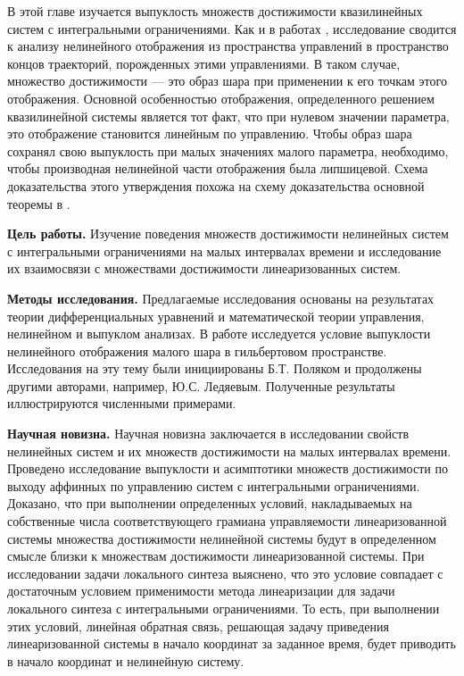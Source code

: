 \documentclass[../main.tex]{subfiles}
\begin{document}
В этой главе изучается выпуклость множеств достижимости квазилинейных систем с интегральными ограничениями. 
Как и в работах \cite{Polyak2001, Polyak2004, GusOsSteklov, GusevUMJ, Osipov, GusevOsipov},  исследование сводится к анализу нелинейного отображения из пространства управлений в пространство концов траекторий, порожденных этими управлениями.
В таком случае, множество достижимости --- это образ шара при применении к его точкам этого отображения. 
Основной особенностью отображения, определенного решением квазилинейной системы является тот факт, что при нулевом значении параметра, это отображение становится линейным по управлению.
Чтобы образ шара сохранял свою выпуклость при малых значениях малого параметра, необходимо, чтобы производная нелинейной части отображения была липшицевой. 
Схема доказательства этого утверждения похожа на схему доказательства основной теоремы в \cite{Polyak2001}.

\textbf{Цель работы.} Изучение поведения множеств достижимости нелинейных систем с интегральными ограничениями на малых интервалах времени и исследование их взаимосвязи с множествами достижимости линеаризованных систем.
	
\textbf{Методы исследования.} Предлагаемые исследования основаны на результатах теории дифференциальных уравнений и математической теории управления, нелинейном и выпуклом анализах. В работе исследуется условие выпуклости нелинейного отображения малого шара в гильбертовом пространстве. Исследования на эту тему были инициированы Б.Т. Поляком\cite{Polyak2001} и продолжены другими авторами, например, Ю.С. Ледяевым\cite{Ledyaev}. Полученные результаты иллюстрируются численными примерами.
	
\textbf{Научная новизна.} Научная новизна заключается в исследовании свойств нелинейных систем и их множеств достижимости на малых интервалах времени. Проведено исследование выпуклости и асимптотики множеств достижимости по выходу аффинных по управлению систем с интегральными ограничениями. Доказано, что при выполнении определенных условий, накладываемых на собственные числа соответствующего грамиана управляемости линеаризованной системы множества достижимости нелинейной системы будут в определенном смысле близки к множествам достижимости линеаризованной системы. При исследовании задачи локального синтеза выяснено, что это условие совпадает с достаточным условием применимости метода линеаризации для задачи локального синтеза с интегральными ограничениями. То есть, при выполнении этих условий, линейная обратная связь, решающая задачу приведения линеаризованной системы в начало координат за заданное время, будет приводить в начало координат и нелинейную систему.
\end{document}
